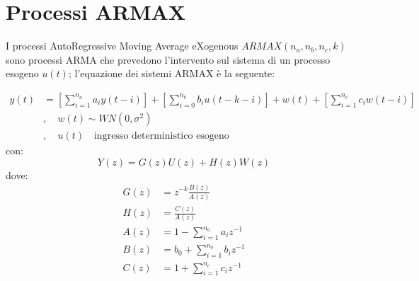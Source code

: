 \section{Processi ARMAX}
I processi AutoRegressive Moving Average eXogenous $ARMAX(n_a,n_b,n_c,k)$ sono processi ARMA che prevedono l'intervento sul sistema di un processo esogeno $u(t)$; l'equazione dei sistemi ARMAX è la seguente:

   \begin{align*}
   y(t)&=\left[ \sum_{i=1}^{n_a}{a_iy(t-i)}\right]+\left[\sum_{i=0}^{n_b}{b_iu(t-k-i)}\right]+w(t)+\left[ \sum_{i=1}^{n_c}{c_iw(t-i)}\right]\\
   &, \quad w(t) \sim WN(0,\sigma^2)\\
   &,\quad u(t)\quad \text{ingresso deterministico esogeno}
   \end{align*} 
con:
  \[ Y(z)= G(z)U(z)+H(z)W(z)\]
dove:
  \begin{align*}
    G(z)&=z^{-k}\frac{B(z)}{A(z)}\\
    H(z)&=\frac{C(z)}{A(z)}\\
    A(z)&=1-\sum_{i=1}^{n_a}{a_iz^{-1}}\\
    B(z)&=b_0+\sum_{i=1}^{n_b}{b_iz^{-1}}\\
    C(z)&=1+\sum_{i=1}^{n_c}{c_iz^{-1}}
  \end{align*}
